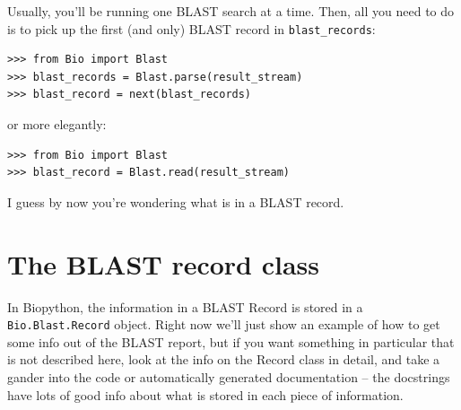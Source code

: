 Usually, you'll be running one BLAST search at a time. Then, all you need
to do is to pick up the first (and only) BLAST record in \verb|blast_records|:
\begin{verbatim}
>>> from Bio import Blast
>>> blast_records = Blast.parse(result_stream)
>>> blast_record = next(blast_records)
\end{verbatim}
\noindent or more elegantly:
\begin{verbatim}
>>> from Bio import Blast
>>> blast_record = Blast.read(result_stream)
\end{verbatim}

I guess by now you're wondering what is in a BLAST record.

\section{The BLAST record class}

In Biopython, the information in a BLAST Record is stored in a \verb|Bio.Blast.Record| object.  Right now we'll just show
an example of how to get some info out of the BLAST report, but if you
want something in particular that is not described here, look at the
info on the Record class in detail, and take a gander into the code or
automatically generated documentation -- the docstrings have lots of
good info about what is stored in each piece of information.

